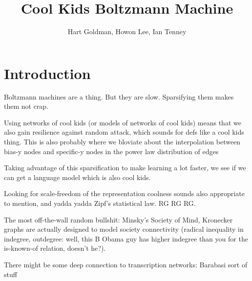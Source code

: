 \documentclass[12pt]{article}
\begin{document}
\title{Cool Kids Boltzmann Machine}
\author{Hart Goldman, Howon Lee, Ian Tenney}
\maketitle

\section{Introduction}
Boltzmann machines are a thing. But they are slow. Sparsifying them makes them not crap.

Using networks of cool kids (or models of networks of cool kids) means that we also gain resilience against random attack, which sounds for defs like a cool kids thing. This is also probably where we bloviate about the interpolation between bias-y nodes and specific-y nodes in the power law distribution of edges

Taking advantage of this sparsification to make learning a lot faster, we see if we can get a language model which is also cool kids.

Looking for scale-freedom of the representation coolness sounds also appropriate to mention, and yadda yadda Zipf's statistical law. RG RG RG.

The most off-the-wall random bullshit: Minsky's Society of Mind, Kronecker graphs are actually designed to model society connectivity (radical inequality in indegree, outdegree: well, this B Obama guy has higher indegree than you for the is-known-of relation, doesn't he?).

There might be some deep connection to transcription networks: Barabasi sort of stuff
\end{document}
